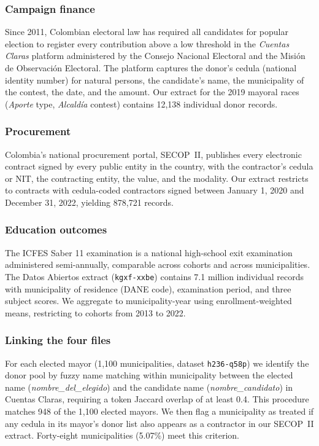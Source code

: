 \documentclass[12pt]{article}
\begin{document}
\subsubsection*{Campaign finance} Since 2011, Colombian electoral law has required all candidates for popular election to register every contribution above a low threshold in the \textit{Cuentas Claras} platform administered by the Consejo Nacional Electoral and the Misi\'on de Observaci\'on Electoral. The platform captures the donor's cedula (national identity number) for natural persons, the candidate's name, the municipality of the contest, the date, and the amount. Our extract for the 2019 mayoral races (\textit{Aporte} type, \textit{Alcald\'ia} contest) contains 12{,}138 individual donor records.

\subsubsection*{Procurement} Colombia's national procurement portal, SECOP~II, publishes every electronic contract signed by every public entity in the country, with the contractor's cedula or NIT, the contracting entity, the value, and the modality. Our extract restricts to contracts with cedula-coded contractors signed between January 1, 2020 and December 31, 2022, yielding 878{,}721 records.

\subsubsection*{Education outcomes} The ICFES Saber 11 examination is a national high-school exit examination administered semi-annually, comparable across cohorts and across municipalities. The Datos Abiertos extract (\texttt{kgxf-xxbe}) contains 7.1 million individual records with municipality of residence (DANE code), examination period, and three subject scores. We aggregate to municipality-year using enrollment-weighted means, restricting to cohorts from 2013 to 2022.

\subsubsection*{Linking the four files} For each elected mayor (1{,}100 municipalities, dataset \texttt{h236-q58p}) we identify the donor pool by fuzzy name matching within municipality between the elected name (\textit{nombre\_del\_elegido}) and the candidate name (\textit{nombre\_candidato}) in Cuentas Claras, requiring a token Jaccard overlap of at least 0.4. This procedure matches 948 of the 1{,}100 elected mayors. We then flag a municipality as treated if any cedula in its mayor's donor list also appears as a contractor in our SECOP~II extract. Forty-eight municipalities (5.07\%) meet this criterion.
\end{document}
